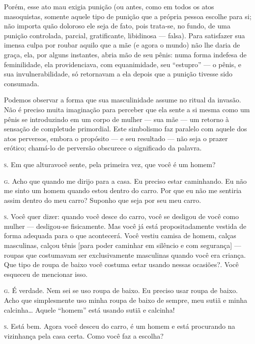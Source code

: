 Porém, esse ato mau exigia punição\idxmasoqpun{} (ou antes, como em todos os atos
masoquistas, somente aquele tipo de punição que a própria pessoa
escolhe para si; não importa quão doloroso ele seja de fato, pois
trata-se, no fundo, de uma punição controlada, parcial, gratificante,
libidinosa --- falsa). Para satisfazer sua imensa culpa por roubar
aquilo que a mãe (e agora o mundo) não lhe daria de graça, ela, por
alguns instantes, abria mão de seu pênis: numa forma indefesa de
feminilidade, ela providenciava, com equanimidade, seu
``estupro'' --- o pênis, e sua
invulnerabilidade, só retornavam a ela depois que a punição tivesse
sido consumada.

Podemos observar a forma que sua masculinidade assume no ritual da
invasão. Não é preciso muita imaginação para perceber que ela sente a
si mesma como um pênis se introduzindo em um corpo de mulher --- sua
mãe --- um retorno à sensação de completude primordial. Este
simbolismo\idxpervsimbo{} faz paralelo com aquele dos atos perversos, embora o
propósito --- e seu resultado --- não seja o prazer erótico;
chamá-lo de perversão obscurece o significado da palavra.


\bigskip

\noindent\hskip0mm\textsc{s.} Em que altura\idxidenhis[|(] você sente, pela primeira vez, que você é um homem?

\noindent\hskip0mm\textsc{g.} Acho que quando me dirijo para a casa. Eu preciso estar caminhando.
Eu não me sinto um homem quando estou dentro do carro. Por que eu não
me sentiria assim dentro do meu carro? Suponho que seja por seu meu
carro.

\noindent\hskip0mm\textsc{s.} Você quer dizer: quando você desce do carro, você se desligou de você
como mulher --- desligou-se fisicamente. Mas você já está
propositadamente vestida de forma adequada para o que acontecerá.
Você vestiu camisa de homem, calças masculinas, calçou tênis [para
poder caminhar em silêncio e com segurança] --- roupas que costumavam
ser exclusivamente masculinas quando você era criança. Que tipo de
roupa de baixo você costuma estar usando nessas ocasiões?. Você esqueceu de mencionar isso.

\noindent\hskip0mm\textsc{g.} É verdade. Nem sei se uso roupa de baixo. Eu preciso usar roupa de
baixo. Acho que simplesmente uso minha roupa de baixo de sempre, meu
sutiã e minha calcinha\ldots{} Aquele ``homem''
está usando sutiã e calcinha!

\noindent\hskip0mm\textsc{s.} Está bem. Agora você desceu do carro, é um homem e está procurando na
vizinhança pela casa certa. Como você faz a escolha?

